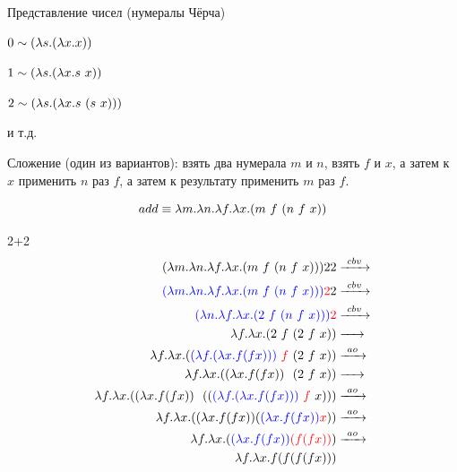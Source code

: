 \begin{frame}{Представление чисел (нумералы Чёрча)}

$ 0 \sim (\lambda s . (\lambda x . x))$

$ 1 \sim (\lambda s . (\lambda x . s\ x))$

$ 2 \sim \lam{s}{\lam{x}{s\ (s\ x)}}$

  и т.д.
  \vspace{1cm}

  Сложение (один из вариантов): взять два нумерала $m$ и $n$, взять $f$ и $x$, а затем к $x$ применить $n$ раз $f$, а затем к результату применить $m$ раз $f$.

  \[
  add \equiv \lambda m. \lambda n. \lambda f. \lambda x. (m\ f\  (n\ f\  x))
  \]
\end{frame}
\newcommand{\tb}[1]{\textcolor{blue}{#1}}
\newcommand{\tr}[1]{\textcolor{red}{#1}}
\begin{frame}{2+2}
  \begin{align*}
    (\lambda m. \lambda n. \lambda f. \lambda x. \app{m\ f\ }{\app{n\ f\ }{x}}){} 2 2 &\cbv \\
    \textcolor{blue}{(\lambda m. \lambda n. \lambda f. \lambda x. \app{m\ f\ }{\app{n\ f\ }{x}}) {}} \textcolor{red}{2} 2 &\cbv \\
    \textcolor{blue}{( \lambda n. \lambda f. \lambda x. \app{2\ f\ }{\app{n\ f\ }{x}}){}} \textcolor{red}{2} & \cbv \\
    \lambda f. \lambda x. \app{2\ f\ }{\app{2\ f\ }{x}}   &\xarr{\ \ } \\
    \lambda f. \lambda x. \app{\tb{\lam{f}{\lam{x}{f (f x)}}} \ \tr{f}\ }{\app{2\ f\ }{x}} &\ao \\
    \lambda f. \lambda x. \app{\lam{x}{f (f x)} \ \ }{\app{2\ f\ }{x}} &\xarr{\ \ } \\
    \lambda f. \lambda x. \app{\lam{x}{f (f x)} \ \ } {\app{\app{\tb{\lam{f}{\lam{x}{f (f x)}}}\ \tr{f}\ }{x}}} &\ao \\
    \lambda f. \lambda x. \app{\lam{x}{f (f x)}  } {\app{\tb{\lam{x}{f (f x)} } }{\tr{x}}} &\ao \\
    \lambda f. \lambda x. \app{\tb{\lam{x}{f (f x)} } } {\tr{(f (f x))}} &\ao \\
    \lambda f. \lambda x. f (f (f (f x))) &
  \end{align*}
\end{frame}


